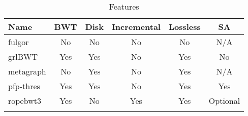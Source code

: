 \documentclass[webpdf,contemporary,large,namedate]{oup-authoring-template}%
\begin{document}
\begin{table}[!tb]
\caption{Features\label{tab:feat}}
\begin{tabular*}{\columnwidth}{@{\extracolsep\fill}lccccc@{\extracolsep\fill}}
\toprule
Name        & BWT & Disk & Incremental & Lossless & SA \\
\midrule
fulgor      & No  & No  & No  & No  & N/A \\
grlBWT      & Yes & Yes & No  & Yes & No \\
metagraph   & No  & Yes & No  & Yes & N/A \\
pfp-thres   & Yes & Yes & No  & Yes & Yes \\
ropebwt3    & Yes & No  & Yes & Yes & Optional \\
\botrule
\end{tabular*}
\end{table}
\end{document}
